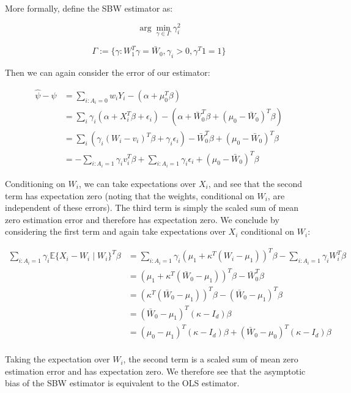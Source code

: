 \documentclass[12pt]{article}
\begin{document}
More formally, define the SBW estimator as:

$$
\arg\min_{\gamma \in \Gamma} \gamma_i^2
$$

$$
\Gamma := \{\gamma: W_1^T\gamma = \bar{W}_0, \gamma_i > 0, \gamma^T1 = 1\}
$$

Then we can again consider the error of our estimator:

\begin{align*}
    \hat{\psi} - \psi &= \sum_{i: A_i = 0}w_iY_i - (\alpha + \mu_0^T\beta) \\
    &= \sum_i \gamma_i(\alpha + X_i^T\beta + \epsilon_i) - (\alpha + \bar{W}_0^T\beta + (\mu_0 - \bar{W}_0)^T\beta) \\
    &= \sum_i (\gamma_i(W_i - v_i)^T\beta + \gamma_i\epsilon_i) - \bar{W}_0^T\beta + (\mu_0 - \bar{W}_0)^T\beta \\
    &= -\sum_{i: A_i = 1}\gamma_iv_i^T\beta + \sum_{i: A_i = 1}\gamma_i\epsilon_i  + (\mu_0 - \bar{W}_0)^T\beta
\end{align*}

Conditioning on $W_i$, we can take expectations over $X_i$, and see that the second term has expectation zero (noting that the weights, conditional on $W_i$, are independent of these errors). The third term is simply the scaled sum of mean zero estimation error and therefore has expectation zero. We conclude by considering the first term and again take expectations over $X_i$ conditional on $W_i$: 

\begin{align*}
    \sum_{i: A_i = 1} \gamma_i\mathbb{E}\{X_i - W_i \mid W_i\}^T\beta &= \sum_{i: A_i = 1} \gamma_i (\mu_1 + \kappa^T(W_i - \mu_1))^T\beta - \sum_{i: A_i = 1}\gamma_i W_i^T\beta \\
    &= (\mu_1 + \kappa^T(\bar{W}_0 - \mu_1))^T\beta - \bar{W}_0^T\beta \\
    &= (\kappa^T(\bar{W}_0 - \mu_1))^T\beta - (\bar{W}_0 - \mu_1)^T\beta  \\
    &= (\bar{W}_0 - \mu_1)^T(\kappa - I_d)\beta \\
    &= (\mu_0 - \mu_1)^T(\kappa - I_d)\beta + (\bar{W}_0 - \mu_0)^T(\kappa - I_d)\beta \\
\end{align*}

Taking the expectation over $W_i$, the second term is a scaled sum of mean zero estimation error and has expectation zero. We therefore see that the asymptotic bias of the SBW estimator is equivalent to the OLS estimator.
\end{document}

